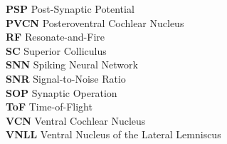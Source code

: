 \begin{tabbing}
    \textbf{PSP} \> Post-Synaptic Potential \\
    \textbf{PVCN} \> Posteroventral Cochlear Nucleus \\
    \textbf{RF} \> Resonate-and-Fire \\
    \textbf{SC} \> Superior Colliculus \\
    \textbf{SNN} \> Spiking Neural Network \\
    \textbf{SNR} \> Signal-to-Noise Ratio \\
    \textbf{SOP} \> Synaptic Operation \\
    \textbf{ToF} \> Time-of-Flight \\
    \textbf{VCN} \> Ventral Cochlear Nucleus \\
    \textbf{VNLL} \> Ventral Nucleus of the Lateral Lemniscus
\end{tabbing}
